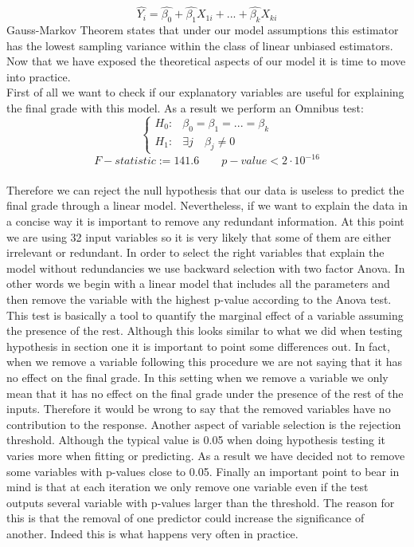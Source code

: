 \documentclass[a4paper, 11pt]{report}
\theoremstyle{definition}
\numberwithin{equation}{section}		%
\numberwithin{table}{section}				%
\begin{document}
$$\hat{Y_i} = \hat{\beta_0} + \hat{\beta_1}X_{1i} + ... +\hat{\beta_k}X_{ki}$$
Gauss-Markov Theorem states that under our model assumptions this estimator has the lowest sampling variance within the class of linear unbiased estimators. Now that we have exposed the theoretical aspects of our model it is time to move into practice.\\[0.3in]
First of all we want to check if our explanatory variables are useful for explaining the final grade with this model. As a result we perform an Omnibus test:
\begin{equation}
    \begin{cases}
      H_0:  & \beta_0 = \beta_1 = ... = \beta_k \\
      H_1:  & \exists j \quad  \beta_j \neq 0
    \end{cases}
  \end{equation}
  \bigskip
$$\boxed{F-statistic := 141.6 \quad \quad  p-value < 2\cdot 10^{-16}}$$
\\[0.2in]
Therefore we can reject the null hypothesis that our data is useless to predict the final grade through a linear model. Nevertheless, if we want to explain the data in a concise way it is important to remove any redundant information. At this point we are using 32 input variables so it is very likely that some of them are either irrelevant or redundant. In order to select the right variables that explain the model without redundancies we use backward selection with two factor Anova. In other words we begin with a linear model that includes all the parameters and then remove the variable with the highest p-value according to the Anova test. This test is basically a tool to quantify the marginal effect of a variable assuming the presence of the rest. Although this looks similar to what we did when testing hypothesis in section one it is important to point some differences out. In fact, when we remove a variable following this procedure we are not saying that it has no effect on the final grade. In this setting when we remove a variable we only mean that it has no effect on the final grade under the presence of the rest of the inputs. Therefore it would be wrong to say that the removed variables have no contribution to the response. Another aspect of variable selection is the rejection threshold. Although the typical value is 0.05 when doing hypothesis testing it varies more when fitting or predicting. As a result we have decided not to remove some variables with p-values close to 0.05. Finally an important point to bear in mind is that at each iteration we only remove one variable even if the test outputs several variable with p-values larger than the threshold. The reason for this is that the removal of one predictor could increase the significance of another. Indeed this is what happens very often in practice. 
\end{document}
